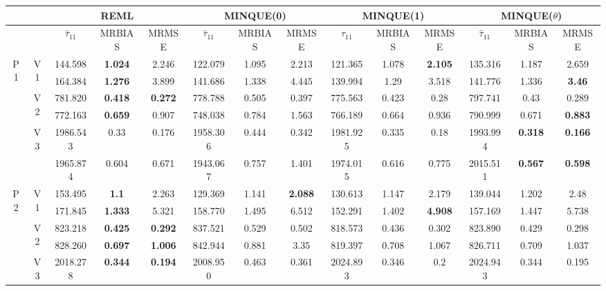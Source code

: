 \documentclass[12pt,a4paper]{article}
\begin{document}
\begin{sidewaystable}[ht]
\centering
{\footnotesize
\begin{tabular}{cc|ccc|ccc|ccc|ccc|}
   & & \multicolumn{3}{c|}{REML}&\multicolumn{3}{c|}{MINQUE(0)}&\multicolumn{3}{c|}{MINQUE(1)}&\multicolumn{3}{c|}{MINQUE($\theta$)}\\ \hline
 &  & $\hat{\tau}_{11}$ & MRBIAS & MRMSE & $\hat{\tau}_{11}$ & MRBIAS & MRMSE & $\hat{\tau}_{11}$ & MRBIAS & MRMSE & $\hat{\tau}_{11}$ & MRBIAS & MRMSE \\ 
  \hline
\multirow{6}{*}{P1} & \multirow{2}{*}{V1} & 144.598 & \textbf{1.024} & 2.246 & 122.079 & 1.095 & 2.213 & 121.365 & 1.078 & \textbf{2.105} & 135.316 & 1.187 & 2.659 \\ 
   &  & 164.384 & \textbf{1.276} & 3.899 & 141.686 & 1.338 & 4.445 & 139.994 & 1.29 & 3.518 & 141.776 & 1.336 & \textbf{3.46} \\ 
   & \multirow{2}{*}{V2} & 781.820 & \textbf{0.418} & \textbf{0.272} & 778.788 & 0.505 & 0.397 & 775.563 & 0.423 & 0.28 & 797.741 & 0.43 & 0.289 \\ 
   &  & 772.163 & \textbf{0.659} & 0.907 & 748.038 & 0.784 & 1.563 & 766.189 & 0.664 & 0.936 & 790.999 & 0.671 & \textbf{0.883} \\ 
   & \multirow{2}{*}{V3} & 1986.543 & 0.33 & 0.176 & 1958.306 & 0.444 & 0.342 & 1981.925 & 0.335 & 0.18 & 1993.994 & \textbf{0.318} & \textbf{0.166} \\ 
   &  & 1965.874 & 0.604 & 0.671 & 1943.067 & 0.757 & 1.401 & 1974.015 & 0.616 & 0.775 & 2015.511 & \textbf{0.567} & \textbf{0.598} \\ 
   \hline \hline\multirow{6}{*}{P2} & \multirow{2}{*}{V1} & 153.495 & \textbf{1.1} & 2.263 & 129.369 & 1.141 & \textbf{2.088} & 130.613 & 1.147 & 2.179 & 139.044 & 1.202 & 2.48 \\ 
   &  & 171.845 & \textbf{1.333} & 5.321 & 158.770 & 1.495 & 6.512 & 152.291 & 1.402 & \textbf{4.908} & 157.169 & 1.447 & 5.738 \\ 
   & \multirow{2}{*}{V2} & 823.218 & \textbf{0.425} & \textbf{0.292} & 837.521 & 0.529 & 0.502 & 818.573 & 0.436 & 0.302 & 823.890 & 0.429 & 0.298 \\ 
   &  & 828.260 & \textbf{0.697} & \textbf{1.006} & 842.944 & 0.881 & 3.35 & 819.397 & 0.708 & 1.067 & 826.711 & 0.709 & 1.037 \\ 
   & \multirow{2}{*}{V3} & 2018.278 & \textbf{0.344} & \textbf{0.194} & 2008.950 & 0.463 & 0.361 & 2024.893 & 0.346 & 0.2 & 2024.943 & 0.344 & 0.195 \\ 

\end{tabular}}
\end{sidewaystable}
\end{document}
